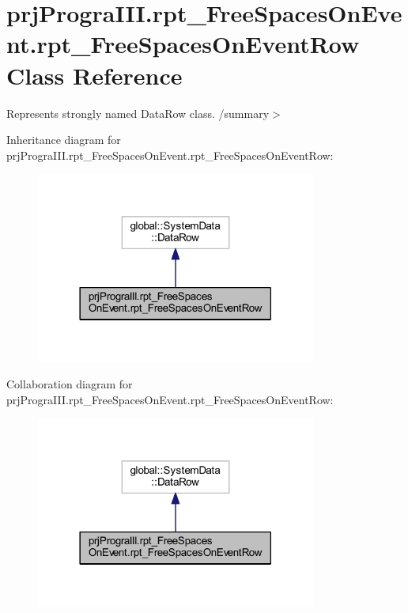 \hypertarget{classprj_progra_i_i_i_1_1rpt___free_spaces_on_event_1_1rpt___free_spaces_on_event_row}{}\section{prj\+Progra\+I\+I\+I.\+rpt\+\_\+\+Free\+Spaces\+On\+Event.\+rpt\+\_\+\+Free\+Spaces\+On\+Event\+Row Class Reference}
\label{classprj_progra_i_i_i_1_1rpt___free_spaces_on_event_1_1rpt___free_spaces_on_event_row}


Represents strongly named Data\+Row class. /summary$>$  




Inheritance diagram for prj\+Progra\+I\+I\+I.\+rpt\+\_\+\+Free\+Spaces\+On\+Event.\+rpt\+\_\+\+Free\+Spaces\+On\+Event\+Row\+:
\nopagebreak
\begin{figure}[H]
\begin{center}
\leavevmode
\includegraphics[width=261pt]{classprj_progra_i_i_i_1_1rpt___free_spaces_on_event_1_1rpt___free_spaces_on_event_row__inherit__graph}
\end{center}
\end{figure}


Collaboration diagram for prj\+Progra\+I\+I\+I.\+rpt\+\_\+\+Free\+Spaces\+On\+Event.\+rpt\+\_\+\+Free\+Spaces\+On\+Event\+Row\+:
\nopagebreak
\begin{figure}[H]
\begin{center}
\leavevmode
\includegraphics[width=261pt]{classprj_progra_i_i_i_1_1rpt___free_spaces_on_event_1_1rpt___free_spaces_on_event_row__coll__graph}
\end{center}
\end{figure}
